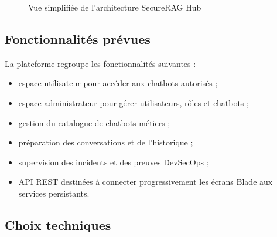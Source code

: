 \begin{figure}[htbp]
    \centering
    \caption{Vue simplifiée de l'architecture SecureRAG Hub}
    \label{fig:vue_simplifiee_securerag}
\end{figure}

\subsection{Fonctionnalités prévues}

La plateforme regroupe les fonctionnalités suivantes :

\begin{itemize}
    \item espace utilisateur pour accéder aux chatbots autorisés ;
    \item espace administrateur pour gérer utilisateurs, rôles et chatbots ;
    \item gestion du catalogue de chatbots métiers ;
    \item préparation des conversations et de l'historique ;
    \item supervision des incidents et des preuves DevSecOps ;
    \item API REST destinées à connecter progressivement les écrans Blade aux services persistants.
\end{itemize}

\subsection{Choix techniques}

